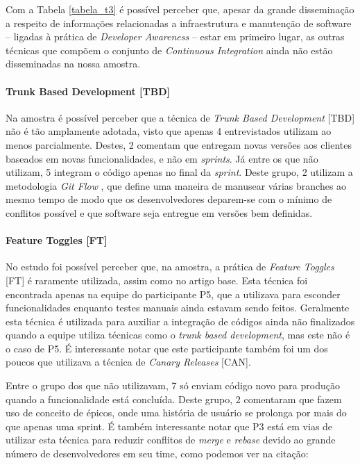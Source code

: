 Com a Tabela \ref{tabela_t3} é possível perceber que, apesar da grande disseminação a respeito de informações relacionadas a infraestrutura e manutenção de software -- ligadas à prática de \emph{Developer Awareness} \cite{awa} -- estar em primeiro lugar, as outras técnicas que compõem o conjunto de \emph{Continuous Integration} ainda não estão disseminadas na nossa amostra.

\paragraph{Trunk Based Development [TBD]}
Na amostra é possível perceber que a técnica de \emph{Trunk Based Development} [TBD] \cite{devAndDeploymentFB} não é tão amplamente adotada, visto que apenas 4 entrevistados utilizam ao menos parcialmente. Destes, 2 comentam que entregam novas versões aos clientes baseados em novas funcionalidades, e não em \emph{sprints}. Já entre os que não utilizam, 5 integram o código apenas no final da \emph{sprint}. Deste grupo, 2 utilizam a metodologia \emph{Git Flow} \cite{gitFlow}, que define uma maneira de manusear várias branches ao mesmo tempo de modo que os desenvolvedores deparem-se com o mínimo de conflitos possível e que software seja entregue em versões bem definidas.

\paragraph{Feature Toggles [FT]}

No estudo foi possível perceber que, na amostra, a prática de \emph{Feature Toggles} [FT] \cite{featureToggles} é raramente utilizada, assim como no artigo base. Esta técnica foi encontrada apenas na equipe do participante P5, que a utilizava para esconder funcionalidades enquanto testes manuais ainda estavam sendo feitos. Geralmente esta técnica é utilizada para auxiliar a integração de códigos ainda não finalizados quando a equipe utiliza técnicas como o \emph{trunk based development}, mas este não é o caso de P5. É interessante notar que este participante também foi um dos poucos que utilizava a técnica de \emph{Canary Releases} [CAN].

Entre o grupo dos que não utilizavam, 7 só enviam código novo para produção quando a funcionalidade está concluída. Deste grupo, 2 comentaram que fazem uso de conceito de épicos, onde uma história de usuário se prolonga por mais do que apenas uma sprint. É também interessante notar que P3 está em vias de utilizar esta técnica para reduzir conflitos de \emph{merge} e \emph{rebase} devido ao grande número de desenvolvedores em seu time, como podemos ver na citação:


